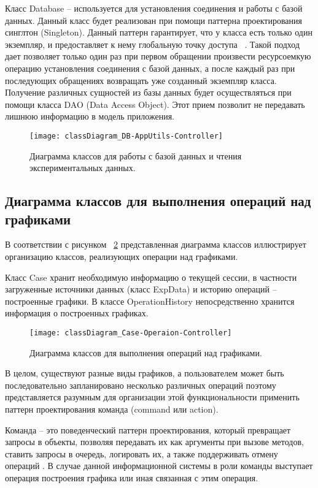 \documentclass[14pt]{extreport}
\begin{document}
Класс Database -- используется для установления соединения и работы с базой данных. Данный класс будет реализован при помощи паттерна проектирования синглтон (Singleton). Данный паттерн гарантирует, что у класса есть только один экземпляр, и предоставляет к нему глобальную точку доступа ~\cite{oop}. Такой подход дает позволяет только один раз при первом обращении произвести ресурсоемкую операцию установления соединения с базой данных, а после каждый раз при последующих обращениях возвращать уже созданный экземпляр класса. Получение различных сущностей из базы данных будет осуществляться при помощи класса DAO (Data Access Object). Этот прием позволит не передавать лишнюю информацию в модель приложения.

\begin{figure}[H]
\centerline{\texttt{[image: classDiagram\_DB-AppUtils-Controller]}}
\caption{Диаграмма классов для работы с базой данных и чтения экспериментальных данных.}
\label{fig7}
\end{figure}

\subsection{Диаграмма классов для выполнения операций над графиками}
В соответствии с рисунком ~\ref{fig8} представленная диаграмма классов иллюстрирует организацию классов, реализующих операции над графиками.

Класс Case хранит необходимую информацию о текущей сессии, в частности загруженные источники данных (класс ExpData) и историю операций -- построенные графики. В классе OperationHistory непосредственно хранится информация о построенных графиках. 

\begin{figure}[H]
\centerline{\texttt{[image: classDiagram\_Case-Operaion-Controller]}}
\caption{Диаграмма классов для выполнения операций над графиками.}
\label{fig8}
\end{figure}

В целом, существуют разные виды графиков, а пользователем может быть последовательно запланировано несколько различных операций поэтому представляется разумным для организации этой функциональности применить паттерн проектирования команда (command или action).

Команда -- это поведенческий паттерн проектирования, который превращает запросы в объекты, позволяя передавать их как аргументы при вызове методов, ставить запросы в очередь, логировать их, а также поддерживать отмену операций \cite{pattern}. В случае данной информационной системы в роли команды выступает операция построения графика или иная связанная с этим операция.
\end{document}
